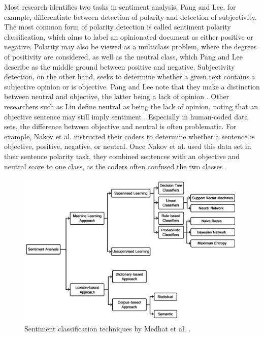 Most research identifies two tasks in sentiment analysis. Pang and Lee, for example, differentiate between detection of polarity and detection of subjectivity. The most common form of polarity detection is called sentiment polarity classification, which aims to label an opinionated document as either positive or negative. Polarity may also be viewed as a multiclass problem, where the degrees of positivity are considered, as well as the neutral class, which Pang and Lee describe as the middle ground between positive and negative. Subjectivity detection, on the other hand, seeks to determine whether a given text contains a subjective opinion or is objective. Pang and Lee note that they make a distinction between neutral and objective, the latter being a lack of opinion \cite{DBLP:journals/ftir/PangL07}. Other researchers such as Liu define neutral as being the lack of opinion, noting that an objective sentence may still imply sentiment \cite{liu_2015}. Especially in human-coded data sets, the difference between objective and neutral is often problematic. For example, Nakov et al. instructed their coders to determine whether a sentence is objective, positive, negative, or neutral. Once Nakov et al. used this data set in their sentence polarity task, they combined sentences with an objective and neutral score to one class, as the coders often confused the two classes \cite{nakov-etal-2013-semeval}.

\begin{figure}
    \centering
    \includegraphics[scale=0.3]{Images/classification_techniques.png}
    \caption{Sentiment classification techniques by Medhat et al. \cite[p.~1095]{MEDHAT20141093}.}
    \label{fig:classifiers}
\end{figure}

